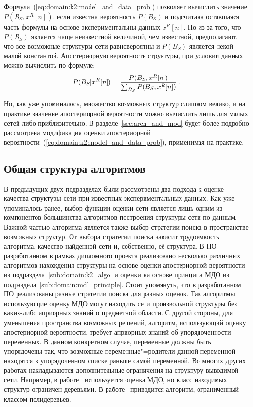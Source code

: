 Формула~(\ref{eq:domain:k2:model_and_data_prob}) позволяет вычислить значение $P(B_S, x^R[n])$, если известна вероятность $P(B_S)$ и подсчитана оставшаяся часть формулы на основе экспериментальны данных $x^R[n]$.
Но из-за того, что $P(B_S)$ является чаще неизвестной величиной, чем известной, предполагают, что все возможные структуры сети равновероятны и $P(B_S)$ является некой малой константой.
Апостериорную вероятность структуры, при условии данных можно вычислить по формуле:
\begin{equation}
  \label{eq:domain:k2:aposteriori_structure_given_data}
  P(B_S | x^R[n]) =
    \frac{P(B_S, x^R[n])}
         {\sum_{B_S}P(B_S, x^R[n])} \text{\,.}
\end{equation}

Но, как уже упоминалось, множество возможных структур слишком велико, и на практике значение апостериорной вероятности можно вычислить лишь для малых сетей либо приблизительно.
В разделе~\ref{sec:arch_and_mod} будет более подробно рассмотрена модификация оценки апостериорной вероятности~(\ref{eq:domain:k2:model_and_data_prob}), применимая на практике.


\subsection{Общая структура алгоритмов}
\label{sub:domain:other_algos}
В предыдущих двух подразделах были рассмотрены два подхода к оценке качества структуры сети при известных экспериментальных данных.
Как уже упоминалось ранее, выбор функции оценки сети является лишь одним из компонентов большинства алгоритмов построения структуры сети по данным.
Важной частью алгоритма является также выбор стратегии поиска в пространстве возможных структур.
От выбора стратегии поиска зависит трудоемкость алгоритма, качество найденной сети и, собственно, её структура.
В ПО разработанном в рамках дипломного проекта реализовано несколько различных алгоритмов нахождения структуры на основе оценки апостериорной вероятности из подраздела~\ref{sub:domain:k2_algo} и оценки на основе принципа МДО из подраздела~\ref{sub:domain:mdl_principle}.
Стоит упомянуть, что в разработанном ПО реализованы разные стратегии поиска для разных оценок.
Так алгоритмы использующие оценку МДО могут находить сети произвольной структуры без каких-либо априорных знаний о предметной области.
С другой стороны, для уменьшения пространства возможных решений, алгоритм, использующий оценку апостериорной вероятности, требует априорных знаний об упорядоченности переменных.
В данном конкретном случае, переменные должны быть упорядочены так, что возможные переменные"=родители данной переменной находятся в упорядоченном списке раньше самой переменной.
Во многих других работах накладываются дополнительные ограничения на структуру выводимой сети.
Например, в работе~\cite{Suzuki93} используется оценка МДО, но класс находимых структур ограничен деревьями.
В работе~\cite{Rebane87} приводится алгоритм, ограниченный классом полидеревьев.


